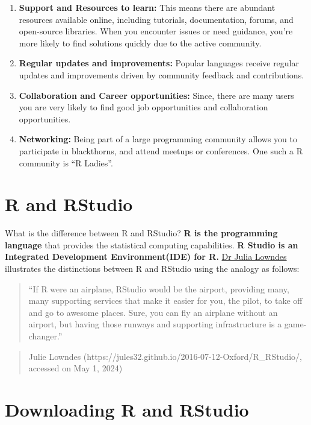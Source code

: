 \documentclass[
  letterpaper,
  DIV=11,
  numbers=noendperiod]{scrreprt}
\begin{document}
\begin{enumerate}
\def\labelenumi{\arabic{enumi}.}
\item
  \textbf{Support and Resources to learn:} This means there are abundant
  resources available online, including tutorials, documentation,
  forums, and open-source libraries. When you encounter issues or need
  guidance, you're more likely to find solutions quickly due to the
  active community.
\item
  \textbf{Regular updates and improvements:} Popular languages receive
  regular updates and improvements driven by community feedback and
  contributions.
\item
  \textbf{Collaboration and Career opportunities:} Since, there are many
  users you are very likely to find good job opportunities and
  collaboration opportunities.
\item
  \textbf{Networking:} Being part of a large programming community
  allows you to participate in blackthorns, and attend meetups or
  conferences. One such a R community is ``R Ladies''.
\end{enumerate}

\hypertarget{r-and-rstudio}{%
\section{R and RStudio}\label{r-and-rstudio}}

What is the difference between R and RStudio? \textbf{R is the
programming language} that provides the statistical computing
capabilities. \textbf{R Studio is an Integrated Development
Environment(IDE) for R.} \href{https://jules32.github.io/}{Dr Julia
Lowndes} illustrates the distinctions between R and RStudio using the
analogy as follows:

\begin{quote}
``If R were an airplane, RStudio would be the airport, providing many,
many supporting services that make it easier for you, the pilot, to take
off and go to awesome places. Sure, you can fly an airplane without an
airport, but having those runways and supporting infrastructure is a
game-changer.''
\end{quote}

\begin{quote}
Julie Lowndes (https://jules32.github.io/2016-07-12-Oxford/R\_RStudio/,
accessed on May 1, 2024)
\end{quote}

\hypertarget{downloading-r-and-rstudio}{%
\section{Downloading R and RStudio}\label{downloading-r-and-rstudio}}
\end{document}
